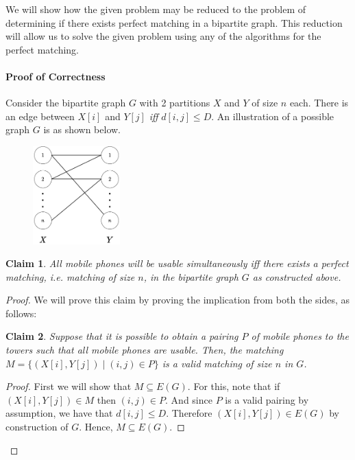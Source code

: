 \documentclass[answers]{exam}
\newtheorem{claim}{Claim}
\begin{document}
\begin{questions}

\begin{solution}
We will show how the given problem may be reduced to the problem of determining if there exists perfect matching in a bipartite graph. This reduction will allow us to solve the given problem using any of the algorithms for the perfect matching. 

\paragraph{Proof of Correctness}
Consider the bipartite graph $G$ with 2 partitions $X$ and $Y$ of size $n$ each. There is an edge between $X[i]$ and $Y[j]$ \emph{iff} $d[i, j] \leq D$.
An illustration of a possible graph $G$ is as shown below.
\begin{figure}[H]
    \centering
    \includegraphics[width=0.3\textwidth]{embed/Bipartite1.pdf}
\end{figure}

\begin{claim}
All mobile phones will be usable simultaneously \emph{iff} there exists a perfect matching, i.e. matching of size $n$, in the bipartite graph $G$ as constructed above.
\end{claim}
\begin{proof}
We will prove this claim by proving the implication from both the sides, as follows:
\begin{claim}
Suppose that it is possible to obtain a pairing $P$ of mobile phones to the towers such that all mobile phones are usable. Then, the matching $M = \{(X[i], Y[j]) \mid (i, j) \in P\}$ is a valid matching of size $n$ in $G$.
\end{claim}
\begin{proof}
First we will show that $M \subseteq E(G)$. For this, note that if $(X[i], Y[j]) \in M$ then $(i, j) \in P$. And since $P$ is a valid pairing by assumption, we have that $d[i,j] \leq D$. Therefore $(X[i], Y[j]) \in E(G)$ by construction of $G$. Hence, $M \subseteq E(G)$. 


\end{proof}
\end{proof}
\end{solution}
\end{questions}
\end{document}
